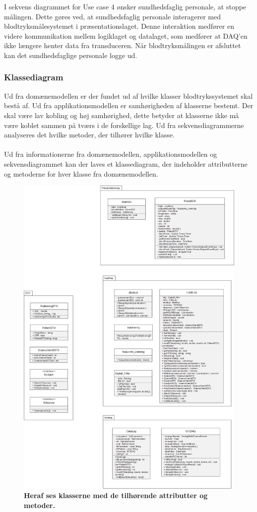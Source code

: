 I sekvens diagrammet for Use case 4 ønsker sundhedsfaglig personale, at stoppe målingen. Dette gøres ved, at sundhedsfaglig personale interagerer med blodtryksmålesystemet i præsentationslaget. Denne interaktion medfører en videre kommunikation mellem logiklaget og datalaget, som medfører at DAQ'en ikke længere henter data fra transduceren. Når blodtryksmålingen er afsluttet kan det sundhedsfaglige personale logge ud. 
\subsubsection{Klassediagram}
Ud fra domænemodellen er der fundet ud af hvilke klasser blodtrykssystemet skal bestå af. Ud fra applikationsmodellen er samhørigheden af klasserne bestemt. Der skal være lav kobling og høj samhørighed, dette betyder at klasserne ikke må være koblet sammen på tværs i de forskellige lag. Ud fra sekvensdiagrammerne analyseres det hvilke metoder, der tilhører hvilke klasse.\\\\
Ud fra informationerne fra domænemodellen, applikationsmodellen og sekvensdiagrammet kan der laves et klassediagram, der indeholder attributterne og metoderne for hver klasse fra domænemodellen.
\begin{figure}[H]
\includegraphics[width =1.0\textwidth , center]{billeder/klassediagram1}
\caption{\textbf{Heraf ses klasserne med de tilhørende attributter og metoder.}}
\end{figure}
